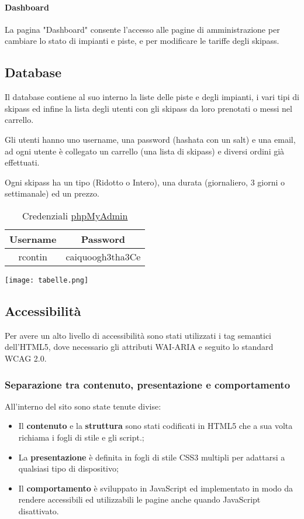 \paragraph{Dashboard}
La pagina "Dashboard" consente l'accesso alle pagine di amministrazione per cambiare lo stato di impianti e piste, e per modificare le tariffe degli skipass.


\subsection{Database}
Il database contiene al suo interno la liste delle piste e degli impianti, i vari tipi di skipass ed infine la lista degli utenti con gli skipass da loro prenotati o messi nel carrello.

Gli utenti hanno uno username, una password (hashata con un salt) e una email, ad ogni utente è collegato un carrello (una lista di skipass) e diversi ordini già effettuati.

Ogni skipass ha un tipo (Ridotto o Intero), una durata (giornaliero, 3 giorni o settimanale) ed un prezzo.

\begin{table}[H]
    \centering
    \begin{tabular}{|c|c|}
        \hline
        \rowcolor[HTML]{96FFFB} 
        \textbf{Username} & \textbf{Password} \\ \hline
        rcontin & caiquoogh3tha3Ce \\ \hline
    \end{tabular}
    \caption{Credenziali \href{http://tecweb.studenti.math.unipd.it/phpmyadmin}{phpMyAdmin}}
\end{table}
\texttt{[image: tabelle.png]}



\subsection{Accessibilità}
Per avere un alto livello di accessibilità sono stati utilizzati i tag semantici dell'HTML5, dove necessario gli attributi WAI-ARIA e seguito lo standard WCAG 2.0.
\subsubsection{Separazione tra contenuto, presentazione e comportamento}
All'interno del sito sono state tenute divise:
\begin{itemize}
    \item 
        Il \textbf{contenuto} e la \textbf{struttura} sono stati codificati in HTML5 che a sua volta richiama i fogli di stile e gli script.;
    \item 
        La \textbf{presentazione} è definita in fogli di stile CSS3 multipli per adattarsi a qualsiasi tipo di dispositivo;
    \item 
        Il \textbf{comportamento} è sviluppato in JavaScript ed implementato in modo da rendere accessibili ed utilizzabili le pagine anche quando JavaScript disattivato.
\end{itemize}

